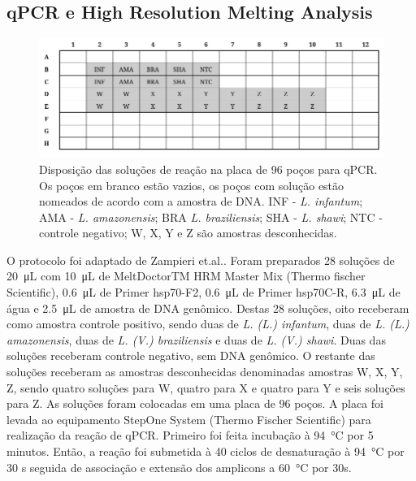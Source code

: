      
\subsection{qPCR e High Resolution Melting Analysis}

\begin{figure}
    \centering
    \includegraphics[width=.4\textwidth]{fig/placa_org.png}
    \caption{Disposição das soluções de reação na placa de 96 poços para qPCR. Os poços em branco estão vazios, os poços com solução estão nomeados de acordo com a amostra de DNA. INF - \textit{L. infantum}; AMA - \textit{L. amazonensis}; BRA \textit{L. braziliensis}; SHA - \textit{L. shawi}; NTC - controle negativo; W, X, Y e Z são amostras desconhecidas.}
    \label{wellorg}
\end{figure}

O protocolo foi adaptado de Zampieri et.al.\cite{HRMzampi2016}.  Foram
preparados 28 soluções de \qty{20}{\micro\liter} com \qty{10}{\micro\liter} de
MeltDoctorTM HRM Master Mix (Thermo fischer Scientific), \qty{0,6}{\micro\liter}
de Primer hsp70-F2, \qty{0,6}{\micro\liter} de Primer hsp70C-R,
\qty{6,3}{\micro\liter} de água e \qty{2,5}{\micro\liter} de amostra de DNA
genômico. Destas 28 soluções, oito receberam como amostra controle positivo,
sendo duas de \textit{L. (L.) infantum}, duas de \textit{L. (L.) amazonensis},
duas de \textit{L. (V.) braziliensis} e duas de \textit{L. (V.) shawi}. Duas das
soluções receberam controle negativo, sem DNA genômico. O restante das soluções
receberam as amostras desconhecidas denominadas amostras W, X, Y, Z, sendo
quatro soluções para W, quatro para  X e quatro para Y e seis soluções para Z.
As soluções foram colocadas em uma placa de 96 poços. A placa foi levada ao
equipamento StepOne System (Thermo Fischer Scientific) para realização da reação
de qPCR. Primeiro foi feita incubação à \qty{94}{\celsius} por 5 minutos.
Então, a reação foi submetida à 40 ciclos de desnaturação à \qty{94}{\celsius}
por 30 s seguida de associação e extensão dos amplicons  a \qty{60}{\celsius}
por 30s. 


